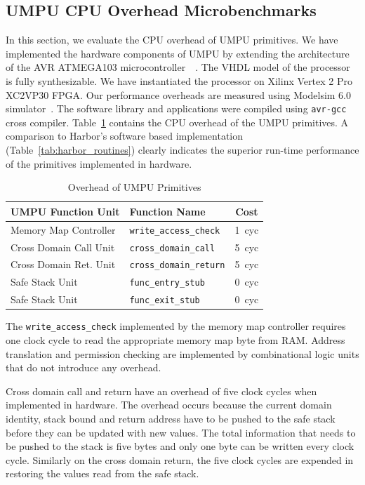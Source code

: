 \subsection{UMPU CPU Overhead Microbenchmarks}
%
In this section, we evaluate the CPU overhead of UMPU primitives.
%
We have implemented the hardware components of UMPU by extending
the architecture of the AVR ATMEGA103
microcontroller~\cite{avr103manual}~\cite{avropencores}.
%
The VHDL model of the processor is fully synthesizable.
%
We have instantiated the processor on Xilinx Vertex 2 Pro XC2VP30 FPGA.
%
Our performance overheads are measured using Modelsim 6.0
simulator~\cite{modelsim}.
%
The software library and applications were compiled using
\texttt{avr-gcc} cross compiler.
%
Table~\ref{tab:umpumicrobmperf} contains the CPU overhead of the UMPU
primitives.
%
A comparison to Harbor's software based implementation
(Table~\ref{tab:harbor_routines}) clearly indicates the superior
run-time performance of the primitives implemented in hardware.
%
\begin{table}[htdp]
\centering
\small{
\begin{tabular}{|l|l|c|}
	\hline
	UMPU Function Unit & Function Name & Cost\\
	\hline
	Memory Map Controller &\texttt{write\_access\_check} & 1~cyc\\
	Cross Domain Call Unit &\texttt{cross\_domain\_call} & 5~cyc\\
	Cross Domain Ret. Unit &\texttt{cross\_domain\_return} & 5~cyc\\
	Safe Stack Unit &\texttt{func\_entry\_stub} & 0~cyc\\
	Safe Stack Unit &\texttt{func\_exit\_stub} & 0~cyc\\
	\hline
\end{tabular}}
\caption{Overhead of UMPU Primitives}
\label{tab:umpumicrobmperf}
\end{table}
%

The \texttt{write\_access\_check} implemented by the memory map
controller requires one clock cycle to read the appropriate memory map
byte from RAM.
%
Address translation and permission checking are
implemented by combinational logic units that do not introduce any overhead.
%

Cross domain call and return have an overhead of five clock cycles
when implemented in hardware.
%
The overhead occurs because the current domain identity, stack bound
and return address have to be pushed to the safe stack before they can
be updated with new values.
%
The total information that needs to be pushed to the stack is five
bytes and only one byte can be written every clock cycle.
%
Similarly on the cross domain return, the five clock cycles are
expended in restoring the values read from the safe stack.

